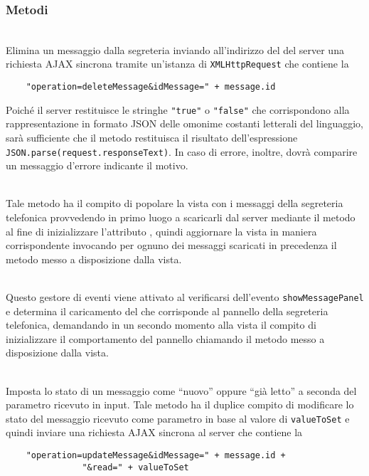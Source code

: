 \subsubsection*{Metodi}
\begin{description}

  \item{}\\
  Elimina un messaggio dalla segreteria inviando all'indirizzo del  del server una richiesta AJAX sincrona tramite un'istanza di \verb'XMLHttpRequest' che contiene la 
  \begin{verbatim}
    "operation=deleteMessage&idMessage=" + message.id
  \end{verbatim}
  
  Poiché il server restituisce le stringhe \verb'"true"' o \verb'"false"' che corrispondono alla rappresentazione in formato JSON delle omonime costanti letterali del linguaggio, sarà sufficiente che il metodo restituisca il risultato dell'espressione \verb'JSON.parse(request.responseText)'. In caso di errore, inoltre, dovrà comparire un messaggio d'errore indicante il motivo.
  
    \item{}\\
  Tale metodo ha il compito di popolare la vista con i messaggi della segreteria telefonica provvedendo in primo luogo a scaricarli dal server mediante il metodo  al fine di inizializzare l'attributo , quindi aggiornare la vista in maniera corrispondente invocando per ognuno dei messaggi scaricati in precedenza il metodo  messo a disposizione dalla vista.
  
    \item{}\\
  Questo gestore di eventi viene attivato al verificarsi dell'evento \verb'showMessagePanel' e determina il caricamento del  che corrisponde al pannello della segreteria telefonica, demandando in un secondo momento alla vista il compito di inizializzare il comportamento del pannello chiamando il metodo  messo a disposizione dalla vista.
  
    \item{}\\
  Imposta lo stato di un messaggio come ``nuovo'' oppure ``già letto'' a seconda del parametro ricevuto in input. Tale metodo ha il duplice compito di modificare lo stato del messaggio ricevuto come parametro in base al valore di \verb'valueToSet' e quindi inviare una richiesta AJAX sincrona al server che contiene la 
  \begin{verbatim}
    "operation=updateMessage&idMessage=" + message.id +
               "&read=" + valueToSet
  \end{verbatim}
  

\end{description}
